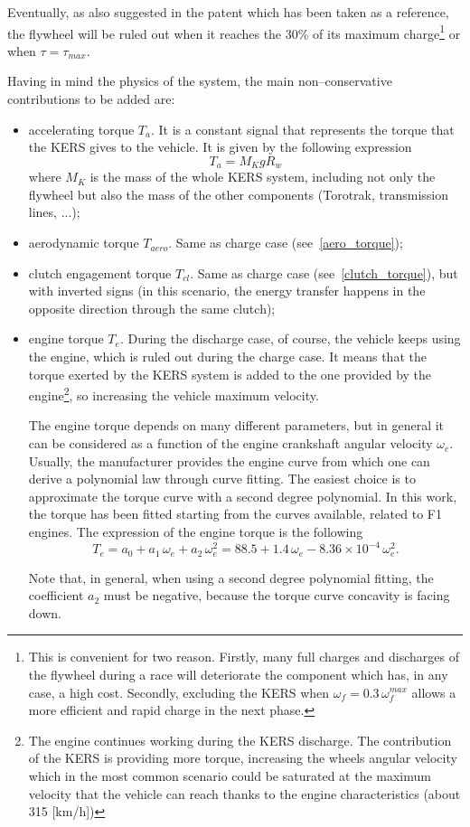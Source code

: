 \documentclass[11pt]{article}
\begin{document}
Eventually, as also suggested in the patent which has been taken as a reference, the flywheel will be ruled out when it reaches the 30\% of its maximum charge\footnote{This is convenient for two reason. Firstly, many full charges and discharges of the flywheel during a race will deteriorate the component which has, in any case, a high cost. Secondly, excluding the KERS when $\omega_f = 0.3\,\omega_f^{max}$ allows a more efficient and rapid charge in the next phase.} or when $\tau = \tau_{max}$.

Having in mind the physics of the system, the main non--conservative contributions to be added are:

\begin{itemize}
\item accelerating torque $T_a$. It is a constant signal that represents the torque that the KERS gives to the vehicle. It is given by the following expression
\begin{equation}
T_a = M_{K} g R_w
\label{accelerating_torque}
\end{equation}
where $M_K$ is the mass of the whole KERS system, including not only the flywheel but also the mass of the other components (Torotrak, transmission lines, ...);
\item aerodynamic torque $T_{aero}$. Same as charge case (see~\eqref{aero_torque});
\item clutch engagement torque $T_{cl}$. Same as charge case (see~\eqref{clutch_torque}), but with inverted signs (in this scenario, the energy transfer happens in the opposite direction through the same clutch);
\item engine torque $T_e$. During the discharge case, of course, the vehicle keeps using the engine, which is ruled out during the charge case. It means that the torque exerted by the KERS system is added to the one provided by the engine\footnote{The engine continues working during the KERS discharge. The contribution of the KERS is providing more torque, increasing the wheels angular velocity which in the most common scenario could be saturated at the maximum velocity that the vehicle can reach thanks to the engine characteristics (about 315 [km/h])}, so increasing the vehicle maximum velocity. 

The engine torque depends on many different parameters, but in general it can be considered as a function of the engine crankshaft angular velocity $\omega_e$. Usually, the manufacturer provides the engine curve from which one can derive a polynomial law through curve fitting. The easiest choice is to approximate the torque curve with a second degree polynomial. In this work, the torque has been fitted starting from the curves available, related to F1 engines. The expression of the engine torque is the following
\begin{equation}
T_e = a_0 + a_1\,\omega_e + a_2 \, \omega_e^2 = 88.5 + 1.4 \,\omega_e -8.36 \times 10^{-4}\,\omega_e^2.
\label{engine_torque}
\end{equation}

Note that, in general, when using a second degree polynomial fitting, the coefficient $a_2$ must be negative, because the torque curve concavity is facing down.  
\end{itemize}
\end{document}
